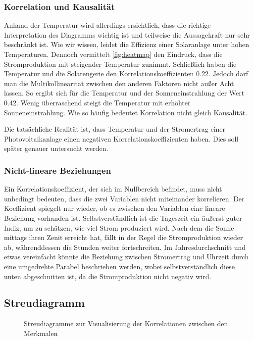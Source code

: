 \documentclass[12pt, a4paper]{article}
\begin{document}
\subsubsection{Korrelation und Kausalität}

Anhand der Temperatur wird allerdings ersichtlich, dass die richtige Interpretation des Diagramms wichtig ist und teilweise die Aussagekraft nur sehr beschränkt ist. Wie wir wissen, leidet die Effizienz einer Solaranlage unter hohen Temperaturen. Dennoch vermittelt \autoref{fig:heatmap} den Eindruck, dass die Stromproduktion mit steigender Temperatur zunimmt. Schließlich haben die Temperatur und die Solarengerie den Korrelationskoeffizienten 0.22. Jedoch darf man die Multikollinearität zwischen den anderen Faktoren nicht außer Acht lassen. So ergibt sich für die Temperatur und der Sonneneinstrahlung der Wert 0.42. Wenig überraschend steigt die Temperatur mit erhöhter Sonneneinstrahlung. Wie so häufig bedeutet Korrelation nicht gleich Kausalität. 

Die tatsächliche Realität ist, dass Temperatur und der Stromertrag einer Photovoltaikanlage einen negativen Korrelationskoeffizienten haben. Dies soll später genauer untersucht werden.

\subsubsection{Nicht-lineare Beziehungen}

Ein Korrelationskoeffizient, der sich im Nullbereich befindet, muss nicht unbedingt bedeuten, dass die zwei Variablen nicht miteinander korrelieren. Der Koeffizient spiegelt nur wieder, ob es zwischen den Variablen eine lineare Beziehung vorhanden ist. Selbstverständlich ist die Tageszeit ein äußerst guter Indiz, um zu schätzen, wie viel Strom produziert wird. Nach dem die Sonne mittags ihren Zenit erreicht hat, fällt in der Regel die Stromproduktion wieder ab, währenddessen die Stunden weiter fortschreiten. Im Jahresdurchschnitt und etwas vereinfacht könnte die Beziehung zwischen Stromertrag und Uhrzeit durch eine umgedrehte Parabel beschrieben werden, wobei selbstverständlich diese unten abgeschnitten ist, da die Stromproduktion nicht negativ wird.


\subsection{Streudiagramm}

\begin{figure}
\centering
\def\svgwidth{450pt}

\caption{Streudiagramme zur Visualisierung der Korrelationen zwischen den Merkmalen}
\label{fig:pairplot_all}
\end {figure}
\end{document}
